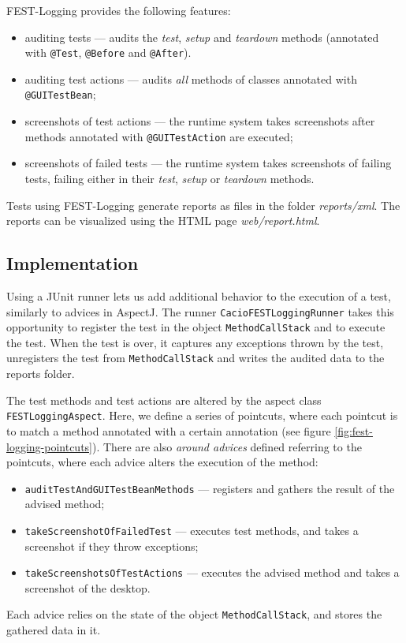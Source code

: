 FEST-Logging provides the following features:
\begin{itemize}
\item auditing tests --- audits the \emph{test}, \emph{setup} and \emph{teardown} methods (annotated with \texttt{@Test}, \texttt{@Before} and \texttt{@After}).
\item auditing test actions --- audits \emph{all} methods of classes annotated with \texttt{@GUITestBean};
\item screenshots of test actions --- the runtime system takes screenshots after methods annotated with \texttt{@GUITestAction} are executed;
\item screenshots of failed tests --- the runtime system takes screenshots of failing tests, failing either in their \emph{test}, \emph{setup} or \emph{teardown} methods. 
\end{itemize}

Tests using FEST-Logging generate reports as files in the folder \emph{reports/xml}. The reports can be visualized using the HTML page \emph{web/report.html}.

\subsection{Implementation}

Using a JUnit runner lets us add additional behavior to the execution of a test, similarly to advices in AspectJ. The runner \texttt{CacioFESTLoggingRunner} takes this opportunity to register the test in the object \texttt{MethodCallStack} and to execute the test. When the test is over, it captures any exceptions thrown by the test, unregisters the test from \texttt{MethodCallStack} and writes the audited data to the reports folder.

The test methods and test actions are altered by the aspect class \texttt{FESTLoggingAspect}. Here, we define a series of pointcuts, where each pointcut is to match a method annotated with a certain annotation (see figure \ref{fig:fest-logging-pointcuts}). There are also \emph{around advices} defined referring to the pointcuts, where each advice alters the execution of the method:
\begin{itemize}
\item \texttt{auditTestAndGUITestBeanMethods} --- registers and gathers the result of the advised method;
\item \texttt{takeScreenshotOfFailedTest} --- executes test methods, and takes a screenshot if they throw exceptions;
\item \texttt{takeScreenshotsOfTestActions} --- executes the advised method and takes a screenshot of the desktop.
\end{itemize}
Each advice relies on the state of the object \texttt{MethodCallStack}, and stores the gathered data in it.

